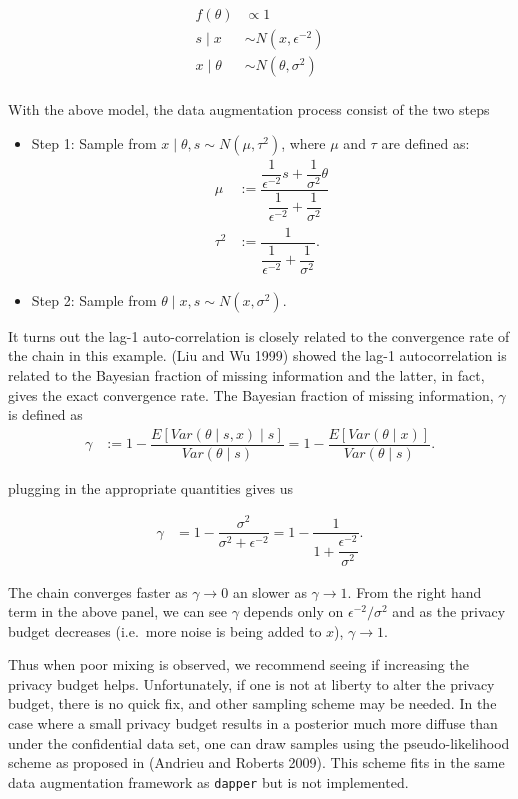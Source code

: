 \[
\begin{aligned}
f(\theta) &\propto 1\\
s \mid x &\sim N(x, \epsilon^{-2})\\
x \mid \theta &\sim N(\theta, \sigma^2)\\
\end{aligned}
\]

With the above model, the data augmentation process consist of the
two steps

\begin{itemize}
\item
  Step 1: Sample from \(x \mid \theta, s \sim N(\mu, \tau^2)\), where
  \(\mu\) and \(\tau\) are defined as:
  \[
  \begin{aligned}
  \mu &:= \dfrac{\dfrac{1}{\epsilon^{-2}}s + \dfrac{1}{\sigma^2}\theta}{\dfrac{1}{\epsilon^{-2}} + \dfrac{1}{\sigma^2}}\\
  \tau^2 &:= \dfrac{1}{\dfrac{1}{\epsilon^{-2}} + \dfrac{1}{\sigma^2}}.
  \end{aligned}
  \]
\item
  Step 2: Sample from \(\theta \mid x, s \sim N(x, \sigma^2)\).
\end{itemize}

It turns out the lag-1 auto-correlation is closely related
to the convergence rate of the chain in this example. (Liu and Wu 1999) showed
the lag-1 autocorrelation is related to the Bayesian fraction of missing information
and the latter, in fact, gives the exact convergence rate. The Bayesian fraction of missing information, \(\gamma\) is
defined as
\begin{align*}
\gamma &:= 1 - \dfrac{E[Var(\theta \mid s, x) \mid s]}{Var(\theta \mid s)} = 1 - \dfrac{E[Var(\theta \mid x)]}{Var(\theta \mid s)}.
\end{align*}

plugging in the appropriate quantities gives us

\begin{align*}
\gamma &= 1 - \dfrac{\sigma^2}{\sigma^2 + \epsilon^{-2}} = 1 - \dfrac{1}{1 + \dfrac{\epsilon^{-2}}{\sigma^2}}.
\end{align*}

The chain converges faster as \(\gamma \to 0\) an slower as \(\gamma \to 1\).
From the right hand term in the above panel, we can see \(\gamma\)
depends only on \(\epsilon^{-2}/\sigma^2\) and as the privacy budget decreases (i.e.~more noise is being added to \(x\)),
\(\gamma \to 1\).

Thus when poor mixing is observed, we recommend seeing if increasing the privacy
budget helps. Unfortunately, if one is not at liberty to alter the privacy budget,
there is no quick fix, and other sampling scheme may be needed.
In the case where a small privacy budget results
in a posterior much more diffuse than under the confidential data set, one
can draw samples using the pseudo-likelihood scheme as proposed in (Andrieu and Roberts 2009). This
scheme fits in the same data augmentation framework as \texttt{dapper} but is not implemented.

